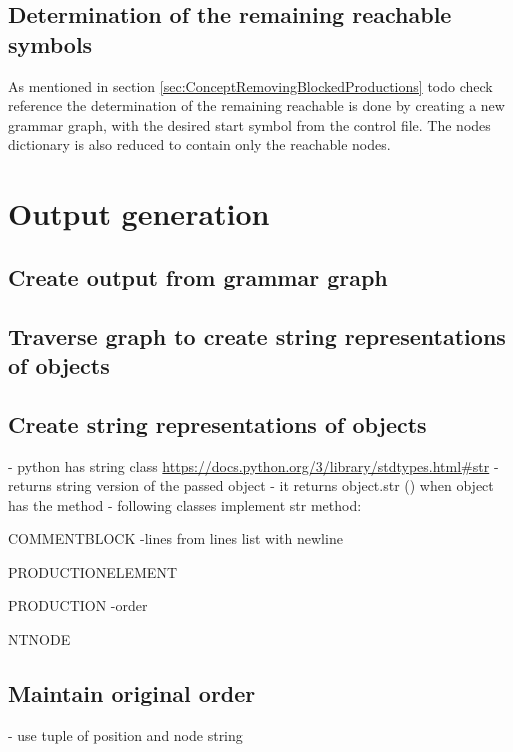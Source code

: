 \subsection{Determination of the remaining reachable symbols}
As mentioned in section \ref{sec:ConceptRemovingBlockedProductions} todo check reference the determination of the remaining reachable is done by creating a new grammar graph, with the desired start symbol from the control file. The nodes dictionary is also reduced to contain only the reachable nodes. 

\section{Output generation}\label{sec:ImplementationOutputGeneration}
\subsection{Create output from grammar graph}\label{sec:ImplementationOutputGrammarGraph}

\subsection{Traverse graph to create string representations of objects}\label{sec:ImpolementationOutputGrammarGraphTraverse}

\subsection{Create string representations of objects}\label{sec:ImplementationOutputGrammarGraphStringRepresentations}

- python has string class \url{https://docs.python.org/3/library/stdtypes.html#str}
- returns string version of the passed object
- it returns object.\textunderscore \textunderscore str \textunderscore \textunderscore () when object has the method
- following classes implement str method:

COMMENT\textunderscore  BLOCK
-lines from lines list with newline

PRODUCTION\textunderscore ELEMENT

PRODUCTION
-order

NTNODE

\subsection{Maintain original order}\label{sec:ImplementationOutputGrammarGraphMaintainOrder}
- use tuple of position and node string


